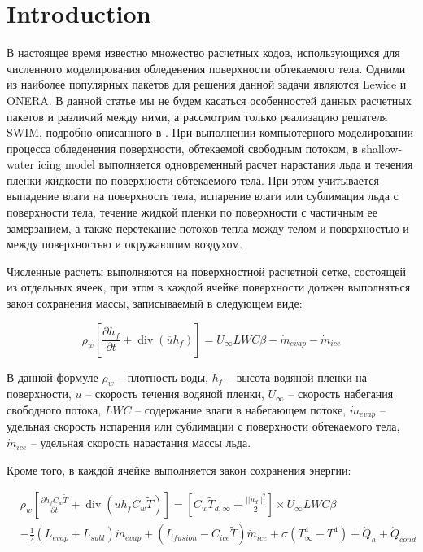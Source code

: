 \documentclass[
11pt,%
tightenlines,%
twoside,%
onecolumn,%
nofloats,%
nobibnotes,%
nofootinbib,%
superscriptaddress,%
noshowpacs,%
centertags]%
{revtex4}
\begin{document}
\section{Introduction}

В настоящее время известно множество расчетных кодов, использующихся для численного моделирования обледенения поверхности обтекаемого тела.
Одними из наиболее популярных пакетов для решения данной задачи являются Lewice \cite{Wright} и ONERA.
В данной статье мы не будем касаться особенностей данных расчетных пакетов и различий между ними, а рассмотрим только реализацию решателя SWIM, подробно описанного в \cite{Bourgault}.
При выполнении компьютерного моделировании процесса обледенения поверхности, обтекаемой свободным потоком, в shallow-water icing model выполняется одновременный расчет нарастания льда и течения пленки жидкости по поверхности обтекаемого тела. При этом учитывается выпадение влаги на поверхность тела, испарение влаги или сублимация льда с поверхности тела, течение жидкой пленки по поверхности с частичным ее замерзанием, а также перетекание потоков тепла между телом и поверхностью и между поверхностью и окружающим воздухом.

Численные расчеты выполняются на поверхностной расчетной сетке, состоящей из отдельных ячеек, при этом в каждой ячейке поверхности должен выполняться закон сохранения массы, записываемый в следующем виде:

\begin{equation}
\rho_w \left[ \frac{\partial h_f}{\partial t} + \operatorname{div}(\overline{u} h_f) \right] = U_{\infty} LWC \beta - \dot m_{evap} - \dot m_{ice}
\end{equation}

В данной формуле $\rho_w$ -- плотность воды, $h_f$ -- высота водяной пленки на поверхности, $\overline{u}$ -- скорость течения водяной пленки, $U_{\infty}$ -- скорость набегания свободного потока, $LWC$ -- содержание влаги в набегающем потоке, $\dot m_{evap}$ -- удельная скорость испарения или сублимации с поверхности обтекаемого тела, $\dot m_{ice}$ -- удельная скорость нарастания массы льда.

Кроме того, в каждой ячейке выполняется закон сохранения энергии:

\begin{equation}
\begin{aligned}
& \rho_w \left[ \frac{\partial h_f C_w \tilde{T}}{\partial t} + \operatorname{div}(\overline{u} h_f C_w \tilde{T}) \right] = \left[ C_w \tilde{T}_{d,\infty} + \frac{||\overline{u}_d||^2}{2} \right] \times U_{\infty} LWC \beta
\\
& - \frac{1}{2}(L_{evap} + L_{subl}) \dot m_{evap} + (L_{fusion} - C_{ice} \tilde{T}) \dot m_{ice} + \sigma (T_{\infty}^4 - T^4) + \dot Q_h + \dot Q_{cond}
\end{aligned}
\end{equation}
\end{document}
